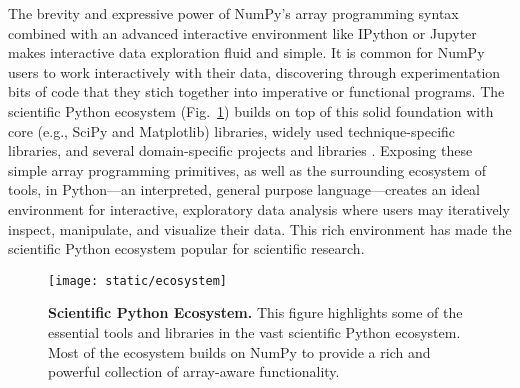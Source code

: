 The brevity and expressive power of NumPy's array programming syntax combined with 
an advanced interactive environment like IPython \cite{perez2007ipython}
or Jupyter \cite{Kluyver:2016aa} makes interactive data exploration fluid and simple.
It is common for NumPy users to work interactively with their data,
discovering through experimentation bits of code that they stich together into
imperative or functional programs.
The scientific Python ecosystem (Fig.~\ref{fig:ecosystem}) builds on top of
this solid foundation with core (e.g., SciPy and Matplotlib) libraries,
widely used technique-specific
libraries\cite{pedregosa2011scikit,vanderwalt2014scikit,SciPyProceedings_11},
and several domain-specific projects and libraries
\cite{astropy:2013,astropy:2018,cock2009biopython,millman2007analysis,2018EGUGA..2012146H}.
Exposing these simple array programming primitives, as well as the surrounding ecosystem of
tools, in Python---an interpreted, general purpose language---creates an ideal environment for
interactive, exploratory data analysis where users may iteratively inspect,
manipulate, and visualize their data.
This rich environment has made the scientific Python ecosystem popular for scientific
research.

\begin{figure}
  \centering
  \texttt{[image: static/ecosystem]}
  \caption{\textbf{Scientific Python Ecosystem.}
   This figure highlights some of the essential tools and libraries in the vast
   scientific Python ecosystem.  Most of the ecosystem builds on NumPy to
   provide a rich and powerful collection of array-aware functionality.
  }
  \label{fig:ecosystem}
\end{figure}

